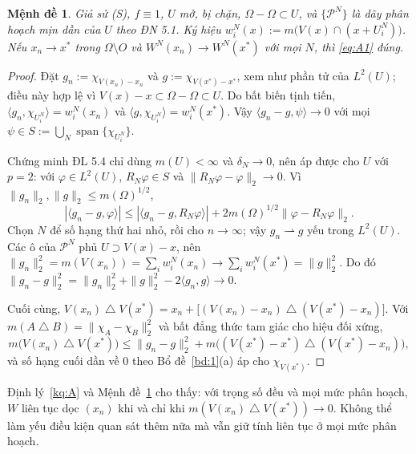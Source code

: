 \documentclass[12pt,a4paper]{article}
\theoremstyle{plain}
\newtheorem{md}[kq]{Mệnh đề}
\theoremstyle{definition}
\newcommand{\sd}{\mathbin{\triangle}}
\begin{document}
\begin{md}\label{md:B}
Giả sử (S), $f\equiv1$, $U$ mở, bị chặn, $\Omega-\Omega\subset U$, và $\{\mathcal P^N\}$ là dãy phân hoạch mịn dần của $U$ theo ĐN 5.1. Ký hiệu $w^N_i(x):=m\big(V(x)\cap(x+U^N_i)\big)$. Nếu $x_n\to x^*$ trong $\Omega\setminus O$ và $W^N(x_n)\to W^N(x^*)$ với mọi $N$, thì \eqref{eq:A1} đúng.
\end{md}
\begin{proof}
Đặt $g_n:=\chi_{V(x_n)-x_n}$ và $g:=\chi_{V(x^*)-x^*}$, xem như phần tử của $L^2(U)$; điều này hợp lệ vì $V(x)-x\subset\Omega-\Omega\subset U$. Do bất biến tịnh tiến, $\langle g_n,\chi_{U^N_i}\rangle=w^N_i(x_n)$ và $\langle g,\chi_{U^N_i}\rangle=w^N_i(x^*)$. Vậy $\langle g_n-g,\psi\rangle\to0$ với mọi $\psi\in S:=\bigcup_N\operatorname{span}\{\chi_{U^N_i}\}$.

Chứng minh ĐL 5.4 chỉ dùng $m(U)<\infty$ và $\delta_N\to0$, nên áp được cho $U$ với $p=2$: với $\varphi\in L^2(U)$, $R_N\varphi\in S$ và $\|R_N\varphi-\varphi\|_2\to0$. Vì $\|g_n\|_2,\|g\|_2\le m(\Omega)^{1/2}$,
\[
|\langle g_n-g,\varphi\rangle|\le|\langle g_n-g,R_N\varphi\rangle|+2m(\Omega)^{1/2}\|\varphi-R_N\varphi\|_2 .
\]
Chọn $N$ để số hạng thứ hai nhỏ, rồi cho $n\to\infty$; vậy $g_n\rightharpoonup g$ yếu trong $L^2(U)$. Các ô của $\mathcal P^N$ phủ $U\supset V(x)-x$, nên $\|g_n\|_2^2=m(V(x_n))=\sum_iw^N_i(x_n)\to\sum_iw^N_i(x^*)=\|g\|_2^2$. Do đó $\|g_n-g\|_2^2=\|g_n\|_2^2+\|g\|_2^2-2\langle g_n,g\rangle\to0$.

Cuối cùng, $V(x_n)\sd V(x^*)=x_n+\big[(V(x_n)-x_n)\sd(V(x^*)-x_n)\big]$. Với $m(A\sd B)=\|\chi_A-\chi_B\|_2^2$ và bất đẳng thức tam giác cho hiệu đối xứng,
\[
m\big(V(x_n)\sd V(x^*)\big)\le\|g_n-g\|_2^2+m\big((V(x^*)-x^*)\sd(V(x^*)-x_n)\big),
\]
và số hạng cuối dần về $0$ theo Bổ đề~\ref{bd:1}(a) áp cho $\chi_{V(x^*)}$.
\end{proof}

Định lý~\ref{kq:A} và Mệnh đề~\ref{md:B} cho thấy: với trọng số đều và mọi mức phân hoạch, $W$ liên tục dọc $(x_n)$ khi và chỉ khi $m(V(x_n)\sd V(x^*))\to0$. Không thể làm yếu điều kiện quan sát thêm nữa mà vẫn giữ tính liên tục ở mọi mức phân hoạch.
\end{document}
